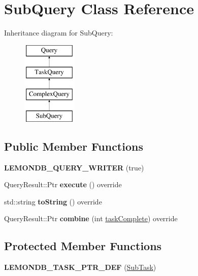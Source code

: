 \hypertarget{class_sub_query}{}\section{Sub\+Query Class Reference}
\label{class_sub_query}
Inheritance diagram for Sub\+Query\+:\begin{figure}[H]
\begin{center}
\leavevmode
\includegraphics[height=4.000000cm]{class_sub_query}
\end{center}
\end{figure}
\subsection*{Public Member Functions}
\begin{DoxyCompactItemize}
\item 
\mbox{\label{class_sub_query_ac4f2c193575f74f0cfba4776bdac56f1}} 
{\bfseries L\+E\+M\+O\+N\+D\+B\+\_\+\+Q\+U\+E\+R\+Y\+\_\+\+W\+R\+I\+T\+ER} (true)
\item 
\mbox{\label{class_sub_query_a84538be0dc7751213fb814ee17fa59d4}} 
Query\+Result\+::\+Ptr {\bfseries execute} () override
\item 
\mbox{\label{class_sub_query_a3644fa8936b941009682a145e5a573aa}} 
std\+::string {\bfseries to\+String} () override
\item 
\mbox{\label{class_sub_query_ab43ddfaec5faaf5914eaa70a3b34d0c1}} 
Query\+Result\+::\+Ptr {\bfseries combine} (int \hyperlink{class_task_query_a3dc3e4c56ddea8ff025239fd9da358d3}{task\+Complete}) override
\end{DoxyCompactItemize}
\subsection*{Protected Member Functions}
\begin{DoxyCompactItemize}
\item 
\mbox{\label{class_sub_query_a3908cdfe9687a134a157a3b1f592419f}} 
{\bfseries L\+E\+M\+O\+N\+D\+B\+\_\+\+T\+A\+S\+K\+\_\+\+P\+T\+R\+\_\+\+D\+EF} (\hyperlink{class_sub_task}{Sub\+Task})
\end{DoxyCompactItemize}
